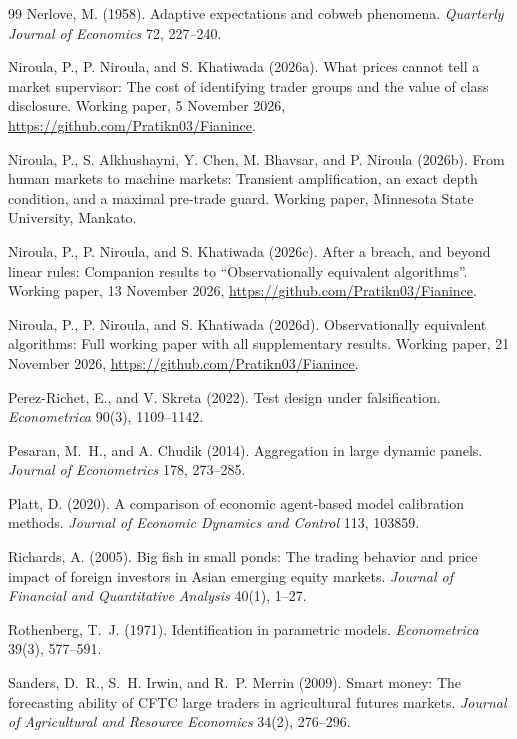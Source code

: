 \documentclass[12pt]{article}
\theoremstyle{definition}
\theoremstyle{remark}
\begin{document}
\begin{thebibliography}{99}
 Nerlove, M. (1958). Adaptive expectations and cobweb phenomena. \emph{Quarterly Journal of Economics} 72, 227--240.

 Niroula, P., P. Niroula, and S. Khatiwada (2026a). What prices cannot tell a market supervisor: The cost of identifying trader groups and the value of class disclosure. Working paper, 5 November 2026, \url{https://github.com/Pratikn03/Fianince}.

 Niroula, P., S. Alkhushayni, Y. Chen, M. Bhavsar, and P. Niroula (2026b). From human markets to machine markets: Transient amplification, an exact depth condition, and a maximal pre-trade guard. Working paper, Minnesota State University, Mankato.

 Niroula, P., P. Niroula, and S. Khatiwada (2026c). After a breach, and beyond linear rules: Companion results to ``Observationally equivalent algorithms''. Working paper, 13 November 2026, \url{https://github.com/Pratikn03/Fianince}.

 Niroula, P., P. Niroula, and S. Khatiwada (2026d). Observationally equivalent algorithms: Full working paper with all supplementary results. Working paper, 21 November 2026, \url{https://github.com/Pratikn03/Fianince}.

 Perez-Richet, E., and V. Skreta (2022). Test design under falsification. \emph{Econometrica} 90(3), 1109--1142.

 Pesaran, M.~H., and A. Chudik (2014). Aggregation in large dynamic panels. \emph{Journal of Econometrics} 178, 273--285.

 Platt, D. (2020). A comparison of economic agent-based model calibration methods. \emph{Journal of Economic Dynamics and Control} 113, 103859.

 Richards, A. (2005). Big fish in small ponds: The trading behavior and price impact of foreign investors in Asian emerging equity markets. \emph{Journal of Financial and Quantitative Analysis} 40(1), 1--27.

 Rothenberg, T.~J. (1971). Identification in parametric models. \emph{Econometrica} 39(3), 577--591.

 Sanders, D.~R., S.~H. Irwin, and R.~P. Merrin (2009). Smart money: The forecasting ability of CFTC large traders in agricultural futures markets. \emph{Journal of Agricultural and Resource Economics} 34(2), 276--296.


\end{thebibliography}
\end{document}
